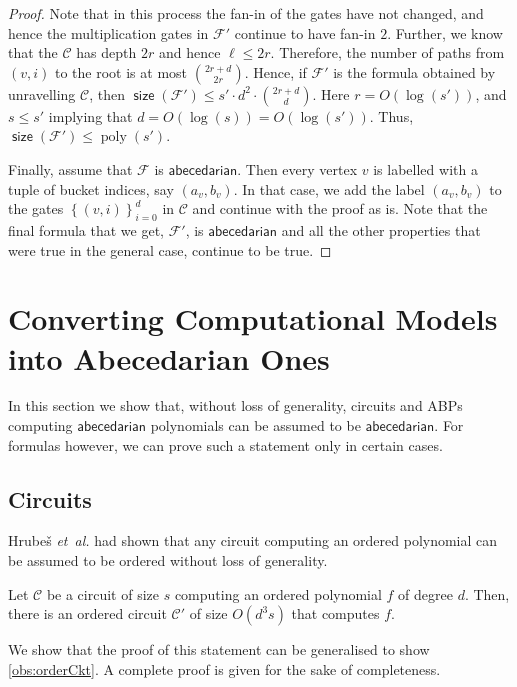 \documentclass[10pt,a4paper]{article}
\def\etal{\emph{et~al.}}
\def\Hrubes{Hrube{\v{s}}}
\def\poly{\operatorname{poly}}
\def\set#1{\left\{ #1 \right\}}
\newcommand{\ckt}{\textbf{$\mathcal{C}$}}
\newcommand{\form}{\textbf{$\mathcal{F}$}}
\newcommand{\size}{\operatorname{\mathsf{size}}}
\newcommand{\abcd}{\mathsf{abecedarian}}
\begin{document}
\begin{proof}
	Note that in this process the fan-in of the gates have not changed, and hence the multiplication gates in $\form'$ continue to have fan-in $2$.
	Further, we know that the $\ckt$ has depth $2r$ and hence $\ell \leq 2r$. 
	Therefore, the number of paths from $(v, i)$ to the root is at most $2r + d \choose 2r$. 
	Hence, if $\form'$ is the formula obtained by unravelling $\ckt$, then $\size(\form') \leq s' \cdot d^2 \cdot {2r + d \choose d}$.	
	Here $r = O(\log(s'))$, and $s \leq s'$ implying that $d = O(\log(s)) = O(\log(s'))$.
	Thus, $\size(\form') \leq \poly(s')$.

	Finally, assume that $\form$ is $\abcd$.
	Then every vertex $v$ is labelled with a tuple of bucket indices, say $(a_v,b_v)$.
	In that case, we add the label $(a_v,b_v)$ to the gates $\set{(v,i)}_{i=0}^{d}$ in $\ckt$ and continue with the proof as is.
	Note that the final formula that we get, $\form'$, is $\abcd$ and all the other properties that were true in the general case, continue to be true.
\end{proof}

\section{Converting Computational Models into Abecedarian Ones}\label{sec:orderModels}

In this section we show that, without loss of generality, circuits and ABPs computing $\abcd$ polynomials can be assumed to be $\abcd$.
For formulas however, we can prove such a statement only in certain cases.

\subsection{Circuits}\label{sec:orderCkts}
{\Hrubes} {\etal} \cite{HWY11} had shown that any circuit computing an ordered polynomial can be assumed to be ordered without loss of generality. 

\begin{theoremwp}\label{thm:orderHomCkts}
	Let $\ckt$ be a circuit of size $s$ computing an ordered polynomial $f$ of degree $d$. 
	Then, there is an ordered circuit $\ckt'$ of size $O(d^3s)$ that computes $f$.
\end{theoremwp}

\noindent We show that the proof of this statement can be generalised to show \autoref{obs:orderCkt}. 
A complete proof is given for the sake of completeness.
\end{document}
